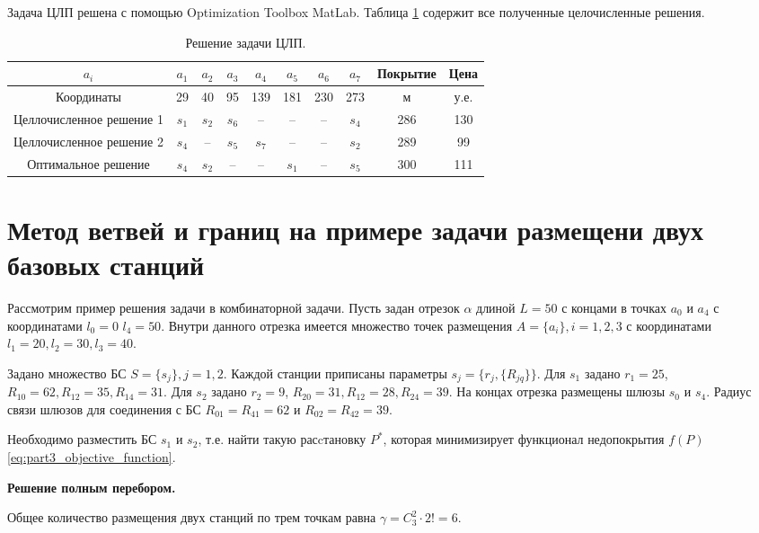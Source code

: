 Задача ЦЛП решена с помощью Optimization Toolbox MatLab. Таблица \cref{tab:part3_ilp_solution} содержит все полученные целочисленные решения.


\begin{table}[h!]\tiny\centering
  \begin{tabular}{|c||c|c|c|c|c|c|c||c|c|}\hline
    $a_i$ & $a_1$ &  $a_2$ & $a_3$ & $a_4$ & $a_5$ & $a_6$ & $a_7$  & Покрытие & Цена \\ \hline 
    Координаты & 29 & 40 & 95 & 139 & 181 & 230 & 273 & м & у.е.\\ \hline \hline
    Целлочисленное решение 1 & $s_1$ & $s_2$ & $s_6$ & -- & -- & -- & $s_4$ & 286 & 130\\ 
    Целлочисленное решение 2 & $s_4$ & -- & $s_5$ & $s_7$ & -- & -- & $s_2$ & 289 & 99\\
    Оптимальное решение & $s_4$ & $s_2$ & -- & -- & $s_1$ & -- & $s_5$ & 300 & 111 \\ \hline
\end{tabular}\caption{Решение задачи ЦЛП.}\label{tab:part3_ilp_solution}
\end{table}

\section{Метод ветвей и границ на примере задачи размещени двух базовых станций}\label{part4:bnb_algorithm}

Рассмотрим пример решения задачи в комбинаторной задачи. Пусть задан отрезок $\alpha$ длиной $L = 50$ с концами в точках $a_0$ и $a_4$ с координатами $l_0 = 0$ $l_4 = 50$. Внутри данного отрезка имеется множество точек размещения $A = \{a_i\}, i = 1, 2, 3$ с координатами $l_1 = 20, l_2 = 30, l_3 = 40$. 

Задано множество БС $S = \{ s_j \} , j = 1, 2$. Каждой станции приписаны параметры $s_j = \{ r_j, \{R_{jq}\}\}$.  Для $s_1$ задано $r_1 = 25$, $R_{10} = 62, R_{12} = 35, R_{14} = 31$. Для $s_2$ задано $r_2 = 9$, $R_{20} = 31, R_{12} = 28, R_{24} = 39$.
На концах отрезка размещены шлюзы $s_0$ и $s_4$. Радиус связи шлюзов для соединения с БС $R_{01} = R_{41} = 62$ и $R_{02} = R_{42} = 39$. 


Необходимо разместить БС $s_1$ и $s_2$, т.е. найти такую расcтановку $P^*$, которая минимизирует функционал недопокрытия $f(P)$ \cref{eq:part3_objective_function}.

\textbf{Решение полным перебором.}

Общее количество размещения двух станций по трем точкам равна $\gamma = C^2_3 \cdot 2! = 6$.

